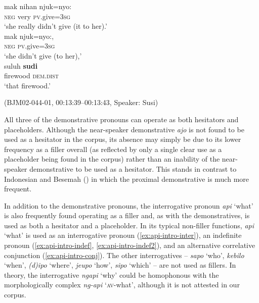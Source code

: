 \documentclass[output=paper,colorlinks,citecolor=brown
\ChapterDOI{10.5281/zenodo.15697585}
]{langscibook}
\begin{document}
\begin{exe}
    \ex\label{ex:intro-sudi} \begin{xlist}[0\quad →A:]
         \gll
        mak nihan njuk=nyo: \\
        \textsc{neg} very \textsc{pv}.give=3\textsc{sg} \\
        \glt `she really didn't give (it to her).' \\
        \exi{2\quad \hphantom{→S:}} \gll
        mak njuk=nyo:, \\
        \textsc{neg} \textsc{pv}.give=3\textsc{sg} \\
        \glt `she didn't give (to her),' \\
         \gll
        suluh \textbf{sudi} \\
        firewood \textsc{dem.dist} \\
        \glt `that firewood.' \\
    \end{xlist}
    \hfill (BJM02-044-01, 00:13:39–00:13:43, Speaker: Susi) 
\end{exe}

All three of the demonstrative pronouns can operate as both hesitators and placeholders. Although the near-speaker demonstrative \textit{ajo} is not found to be used as a hesitator in the corpus, its absence may simply be due to its lower frequency as a filler overall (as reflected by only a single clear use as a placeholder being found in the corpus) rather than an inability of the near-speaker demonstrative to be used as a hesitator. This stands in contrast to Indonesian \citep{wouk2005syntax} and Besemah (\cite{chapters/mcdonnell_billings}) in which the proximal demonstrative is much more frequent.

In addition to the demonstrative pronouns, the interrogative pronoun \textit{api} `what' is also frequently found operating as a filler and, as with the demonstratives, is used as both a hesitator and a placeholder. In its typical non-filler functions, \textit{api} `what' is used as an interrogative pronoun (\ref{ex:api-intro-inter}), an indefinite pronoun (\ref{ex:api-intro-indef}, \ref{ex:api-intro-indef2}), and an alternative correlative conjunction (\ref{ex:api-intro-conj}). The other interrogatives – \textit{sapo} `who', \textit{kebilo} `when', \textit{(d)ipo} `where', \textit{jeupo} `how', \textit{sipo} `which' – are not used as fillers. In theory, the interrogative \textit{ngapi} `why' could be homophonous with the morphologically complex \textit{ng-api} `\textsc{av}-what', although it is not attested in our corpus. 
\end{document}
